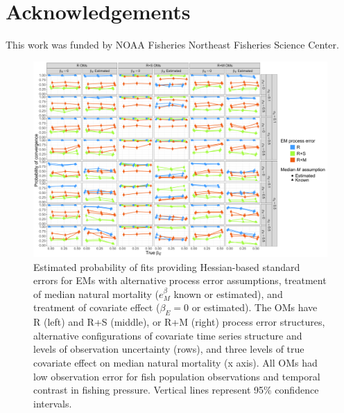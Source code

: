 \documentclass[
  12pt,
]{article}
\newlength{\cslhangindent}
\newlength{\cslentryspacingunit} %
\newenvironment{CSLReferences}[2] %
 {%
  \setlength{\parindent}{0pt}
  \ifodd #1
  \let\oldpar\par
  \def\par{\hangindent=\cslhangindent\oldpar}
  \fi
  \setlength{\parskip}{#2\cslentryspacingunit}
 }%
 {}
\begin{document}
\hypertarget{acknowledgements}{%
\section*{Acknowledgements}\label{acknowledgements}}

This work was funded by NOAA Fisheries Northeast Fisheries Science Center.

\pagebreak



\hypertarget{refs}{}
\begin{CSLReferences}{0}{0}
\end{CSLReferences}

\pagebreak

\begin{landscape}
\begin{figure}
\begin{center}
\includegraphics{convergence_main}
\end{center}
\caption{Estimated probability of fits providing Hessian-based standard errors for EMs with alternative process error assumptions, treatment of median natural mortality ($e^\beta_M$ known or estimated), and treatment of covariate effect ($\beta_E = 0$ or estimated). The OMs have R (left) and R+S (middle), or R+M (right) process error structures, alternative configurations of covariate time series structure and levels of observation uncertainty (rows), and three levels of true covariate effect on median natural mortality (x axis). All OMs had low observation error for fish population observations and temporal contrast in fishing pressure. Vertical lines represent 95\% confidence intervals.}\label{convergence}
\end{figure}
\end{landscape}
\end{document}
